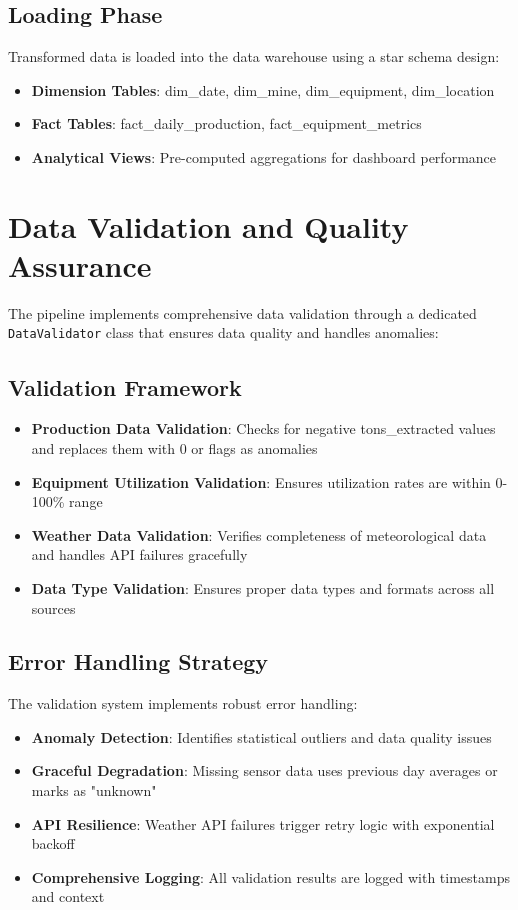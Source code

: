 \documentclass[11pt]{article}
\begin{document}
\subsection{Loading Phase}
Transformed data is loaded into the data warehouse using a star schema design:
\begin{itemize}
    \item \textbf{Dimension Tables}: dim\_date, dim\_mine, dim\_equipment, dim\_location
    \item \textbf{Fact Tables}: fact\_daily\_production, fact\_equipment\_metrics
    \item \textbf{Analytical Views}: Pre-computed aggregations for dashboard performance
\end{itemize}

\section{Data Validation and Quality Assurance}

The pipeline implements comprehensive data validation through a dedicated \texttt{DataValidator} class that ensures data quality and handles anomalies:

\subsection{Validation Framework}
\begin{itemize}
    \item \textbf{Production Data Validation}: Checks for negative tons\_extracted values and replaces them with 0 or flags as anomalies
    \item \textbf{Equipment Utilization Validation}: Ensures utilization rates are within 0-100\% range
    \item \textbf{Weather Data Validation}: Verifies completeness of meteorological data and handles API failures gracefully
    \item \textbf{Data Type Validation}: Ensures proper data types and formats across all sources
\end{itemize}

\subsection{Error Handling Strategy}
The validation system implements robust error handling:
\begin{itemize}
    \item \textbf{Anomaly Detection}: Identifies statistical outliers and data quality issues
    \item \textbf{Graceful Degradation}: Missing sensor data uses previous day averages or marks as "unknown"
    \item \textbf{API Resilience}: Weather API failures trigger retry logic with exponential backoff
    \item \textbf{Comprehensive Logging}: All validation results are logged with timestamps and context
\end{itemize}
\end{document}
